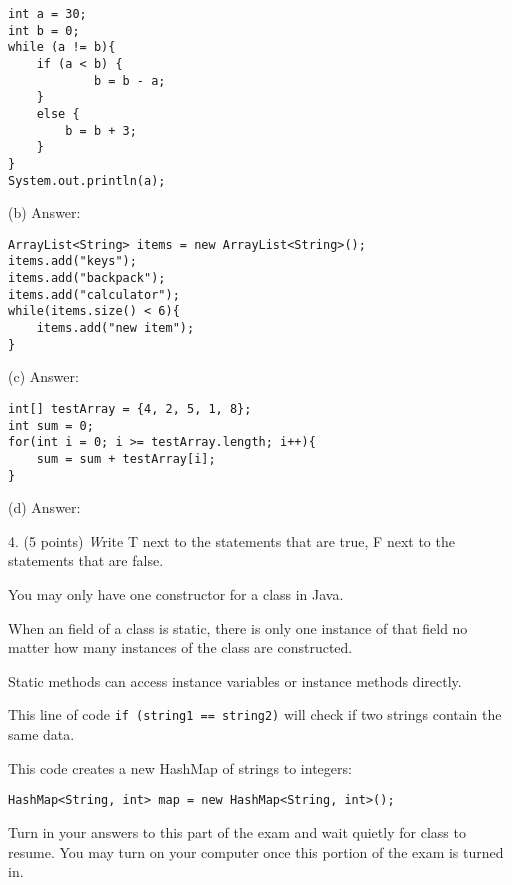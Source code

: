\documentclass[12pt,twoside]{article}
\newcommand{\fillInBlank}[1][0.5in]{\underline{\hspace{#1}}}
\newcommand{\code}[1]{\texttt{#1}}
\begin{document}
\hfill
\begin{minipage}{0.58\linewidth}
\begin{lstlisting}
int a = 30;
int b = 0;
while (a != b){ 
	if (a < b) {
    		b = b - a;
	}
	else {
		b = b + 3;
	}
}
System.out.println(a);
\end{lstlisting}
\end{minipage}
\hspace{0.25in}
\begin{minipage}[t]{0.25\linewidth}
(b) Answer: \fillInBlank
\end{minipage}
\vfill

\hfill
\begin{minipage}{0.58\linewidth}
\begin{lstlisting}
ArrayList<String> items = new ArrayList<String>();
items.add("keys");
items.add("backpack");
items.add("calculator");
while(items.size() < 6){
	items.add("new item");
}
\end{lstlisting}
\end{minipage}
\hspace{0.25in}
\begin{minipage}[t]{0.25\linewidth}
(c) Answer: \fillInBlank
\end{minipage}
\vfill

\hfill
\begin{minipage}{0.58\linewidth}
\begin{lstlisting}
int[] testArray = {4, 2, 5, 1, 8};
int sum = 0;
for(int i = 0; i >= testArray.length; i++){
	sum = sum + testArray[i];
}
\end{lstlisting}
\end{minipage}
\hspace{0.25in}
\begin{minipage}[t]{0.25\linewidth}
(d) Answer: \fillInBlank
\end{minipage}
\vfill

\clearpage

4. (5 points) {\emph Write T next to the statements that are true, F next to the statements that are false. }

  \fillInBlank You may only have one constructor for a class in Java.

  \fillInBlank When an field of a class is static, there is only one instance of that field no matter how many instances of the class are constructed.
 
  \fillInBlank Static methods can access instance variables or instance methods directly.

\fillInBlank This line of code \code {if (string1 == string2)} will check if two strings contain the same data.

\fillInBlank This code creates a new HashMap of strings to integers: 

\hspace{1in}
\code{HashMap<String, int> map = new HashMap<String, int>();}




\vfill
\vfill

\begin{center}
{\Large Turn in your answers to this part of the exam and wait quietly for class to resume. You may turn on your computer once this portion of the exam is turned in.}
\end{center}
\end{document}
